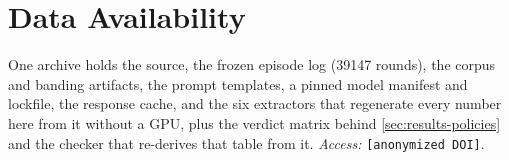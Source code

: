 \section*{Data Availability}
\label{sec:availability}

One archive holds the source, the frozen episode log (\num{39147} rounds), the
corpus and banding artifacts, the prompt templates, a pinned model manifest and
lockfile, the response cache, and the six extractors that regenerate every
number here from it without a GPU, plus the verdict matrix behind
\cref{sec:results-policies} and the checker that re-derives that table from it. \emph{Access:} \texttt{[anonymized DOI]}.
